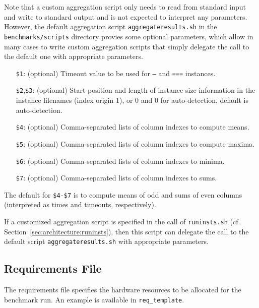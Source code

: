 \documentclass[a4paper]{article}
\begin{document}
			Note that a custom aggregation script only needs to read from standard input and write to standard output
			and is not expected to interpret any parameters.
			However,
			the default aggregation script {\tt aggregateresults.sh} in the {\tt benchmarks/scripts} directory
			provies some optional parameters, which allow in many cases to write custom aggregation scripts
			that simply delegate the call to the default one with appropriate parameters.
	
		    \medskip{}
		    \begin{itemize}
				\item[{\tt \$1}:] (optional) Timeout value to be used for {\tt ---} and {\tt ===} instances.
				\item[{\tt \$2},{\tt \$3}:] (optional) Start position and length of instance size information in the instance filenames (index origin $1$),
					or $0$ and $0$ for auto-detection, default is auto-detection.
				\item[{\tt \$4}:] (optional) Comma-separated lists of column indexes to compute means.
				\item[{\tt \$5}:] (optional) Comma-separated lists of column indexes to compute maxima.
				\item[{\tt \$6}:] (optional) Comma-separated lists of column indexes to minima.
				\item[{\tt \$7}:] (optional) Comma-separated lists of column indexes to sums.
		    \end{itemize}
	
			The default for {\tt \$4-\$7}
			is to compute means of odd and sums of even columns (interpreted as times and timeouts, respectively).
	
			If a customized aggregation script is specified in the call of {\tt runinsts.sh} (cf. Section~\ref{sec:architecture:runinsts}),
			then this script can delegate the call to the default script {\tt aggregateresults.sh} with appropriate parameters.
	
		\subsection{Requirements File}
		\label{sec:architecture:reqfile}
				
			The requirements file specifies the hardware resources to be allocated
			for the benchmark run.
			An example is available in {\tt req\_template}.
			
\end{document}
